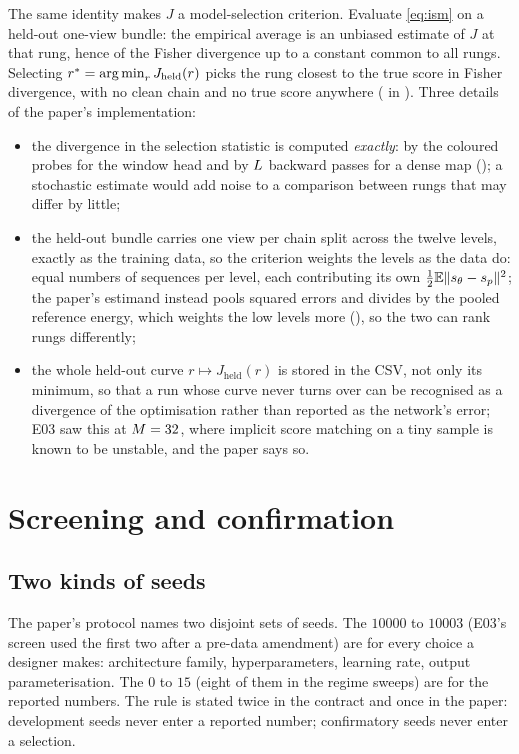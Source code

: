The same identity makes $J$ a model-selection criterion. Evaluate
\cref{eq:ism} on a held-out one-view bundle: the empirical average is an unbiased
estimate of $J$ at that rung, hence of the Fisher divergence up to a constant common to
all rungs. Selecting $r^\ast=\operatorname*{arg\,min}_rJ_{\mathrm{held}}(r)$ picks the rung closest to the
true score in Fisher divergence, with no clean chain and no true score anywhere
( in ). Three details of the
paper's implementation:
\begin{itemize}
\item the divergence in the selection statistic is computed \emph{exactly}: by the
  coloured probes for the window head and by $L$ backward passes for a dense map
  (); a stochastic estimate would add noise to a comparison
  between rungs that may differ by little;
\item the held-out bundle carries one view per chain split across the twelve levels,
  exactly as the training data, so the criterion weights the levels as the data do:
  equal numbers of sequences per level, each contributing its own
  $\tfrac12\mathbb{E}\lVert s_\theta-s_p\rVert^2$; the paper's estimand instead pools squared
  errors and divides by the pooled reference energy, which weights the low levels more
  (), so the two can rank rungs differently;
\item the whole held-out curve $r\mapsto J_{\mathrm{held}}(r)$ is stored in the CSV, not
  only its minimum, so that a run whose curve never turns over can be recognised as a
  divergence of the optimisation rather than reported as the network's error; E03 saw
  this at $M=32$, where implicit score matching on a tiny sample is known to be
  unstable, and the paper says so.
\end{itemize}

\section{Screening and confirmation}
\label{sec:screening}

\subsection{Two kinds of seeds}

The paper's protocol names two disjoint sets of seeds. The 
$10000$ to $10003$ (E03's screen used the first two after a pre-data amendment) are for
every choice a designer makes: architecture family, hyperparameters, learning rate,
output parameterisation. The  $0$ to $15$ (eight of them in the
regime sweeps) are for the reported numbers. The rule is stated twice in the contract
and once in the paper: development seeds never enter a reported number; confirmatory
seeds never enter a selection.

